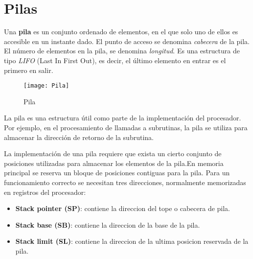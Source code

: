 \section{Pilas}\label{ap:pilas}

Una \textbf{pila} es un conjunto ordenado de elementos, en el que solo uno de ellos es accesible en un instante dado. El punto de acceso se denomina \textit{cabecera} de la pila. El número de elementos en la pila, se denomina \textit{longitud}. Es una estructura de tipo \textit{LIFO} (Last In First Out), es decir, el último elemento en entrar es el primero en salir.

\begin{figure}[h]
  \centering
  \texttt{[image: Pila]}
  \caption{Pila}
\end{figure}

La pila es una estructura útil como parte de la implementación del procesador. Por ejemplo, en el procesamiento de llamadas a subrutinas, la pila se utiliza para almacenar la dirección de retorno de la subrutina.

La implementación de una pila requiere que exista un cierto conjunto de posiciones utilizadas para almacenar los elementos de la pila.En memoria principal se reserva un bloque de posiciones contiguas para la pila.
Para un funcionamiento correcto se necesitan tres direcciones, normalmente memorizadas en registros del procesador:

\begin{itemize}
  \item \textbf{Stack pointer (SP)}: contiene la direccion del tope o cabecera de pila.
  \item \textbf{Stack base (SB)}: contiene la direccion de la base de la pila.
  \item \textbf{Stack limit (SL)}: contiene la direccion de la ultima posicion reservada de la pila.
\end{itemize}